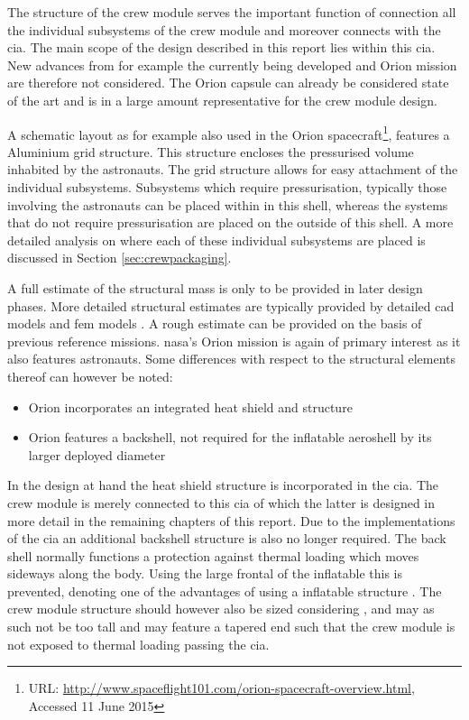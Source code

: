 The structure of the crew module serves the important function of connection all the individual subsystems of the crew module and moreover connects with the \gls{cia}. The main scope of the design described in this report lies within this \gls{cia}. New advances from for example the currently being developed and Orion mission are therefore not considered. The Orion capsule can already be considered state of the art and is in a large amount representative for the crew module design.

A schematic layout as for example also used in the Orion spacecraft\footnote{URL: \url{http://www.spaceflight101.com/orion-spacecraft-overview.html}, Accessed 11 June 2015 }, features a Aluminium grid structure. This structure encloses the pressurised volume inhabited by the astronauts. The grid structure allows for easy attachment of the individual subsystems. Subsystems which require pressurisation, typically those involving the astronauts can be placed within in this shell, whereas the systems that do not require pressurisation are placed on the outside of this shell. A more detailed analysis on where each of these individual subsystems are placed is discussed in Section \ref{sec:crewpackaging}.


A full estimate of the structural mass is only to be provided in later design phases. More detailed structural estimates are typically provided by detailed \gls{cad} models and \gls{fem} models \cite{Wertz2011}. A rough estimate can be provided on the basis of previous reference missions. \gls{nasa}'s Orion mission is again of primary interest as it also features astronauts. Some differences with respect to the structural elements thereof can however be noted:

\begin{itemize}
\item Orion incorporates an integrated heat shield and structure
\item Orion features a backshell, not required for the inflatable aeroshell by its larger deployed diameter
\end{itemize}

In the design at hand the heat shield structure is incorporated in the \gls{cia}. The crew module is merely connected to this \gls{cia} of which the latter is designed in more detail in the remaining chapters of this report. Due to the implementations of the \gls{cia} an additional backshell structure is also no longer required. The back shell normally functions a protection against thermal loading which moves sideways along the body. Using the large frontal of the inflatable this is prevented, denoting one of the advantages of using a inflatable structure \cite{Hughes2005}. The crew module structure should however also be sized considering , and may as such not be too tall and may feature a tapered end such that the crew module is not exposed to thermal loading passing the \gls{cia}.

